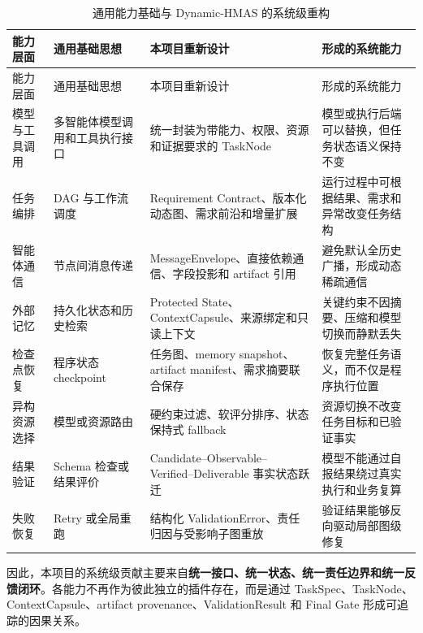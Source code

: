\documentclass[UTF8,a4paper,12pt,oneside]{ctexbook}
\begin{document}
\begin{longtable}{@{}>{\raggedright\arraybackslash}p{}>{\raggedright\arraybackslash}p{}>{\raggedright\arraybackslash}p{}>{\raggedright\arraybackslash}p{}@{}}
\caption{通用能力基础与 Dynamic-HMAS 的系统级重构}
\label{tab:system-reconstruction}\\
\toprule
能力层面 & 通用基础思想 & 本项目重新设计 & 形成的系统能力\\
\midrule
\endfirsthead

\toprule
能力层面 & 通用基础思想 & 本项目重新设计 & 形成的系统能力\\
\midrule
\endhead

模型与工具调用
&
多智能体模型调用和工具执行接口
&
统一封装为带能力、权限、资源和证据要求的 TaskNode
&
模型或执行后端可以替换，但任务状态语义保持不变
\\

任务编排
&
DAG 与工作流调度
&
Requirement Contract、版本化动态图、需求前沿和增量扩展
&
运行过程中可根据结果、需求和异常改变任务结构
\\

智能体通信
&
节点间消息传递
&
MessageEnvelope、直接依赖通信、字段投影和 artifact 引用
&
避免默认全历史广播，形成动态稀疏通信
\\

外部记忆
&
持久化状态和历史检索
&
Protected State、ContextCapsule、来源绑定和只读上下文
&
关键约束不因摘要、压缩和模型切换而静默丢失
\\

检查点恢复
&
程序状态 checkpoint
&
任务图、memory snapshot、artifact manifest、需求摘要联合保存
&
恢复完整任务语义，而不仅是程序执行位置
\\

异构资源选择
&
模型或资源路由
&
硬约束过滤、软评分排序、状态保持式 fallback
&
资源切换不改变任务目标和已验证事实
\\

结果验证
&
Schema 检查或结果评价
&
Candidate--Observable--Verified--Deliverable 事实状态跃迁
&
模型不能通过自报结果绕过真实执行和业务复算
\\

失败恢复
&
Retry 或全局重跑
&
结构化 ValidationError、责任归因与受影响子图重放
&
验证结果能够反向驱动局部图级修复
\\

\bottomrule
\end{longtable}

因此，本项目的系统级贡献主要来自\textbf{统一接口、统一状态、统一责任边界和统一反馈闭环}。各能力不再作为彼此独立的插件存在，而是通过 TaskSpec、TaskNode、ContextCapsule、artifact provenance、ValidationResult 和 Final Gate 形成可追踪的因果关系。
\end{document}
